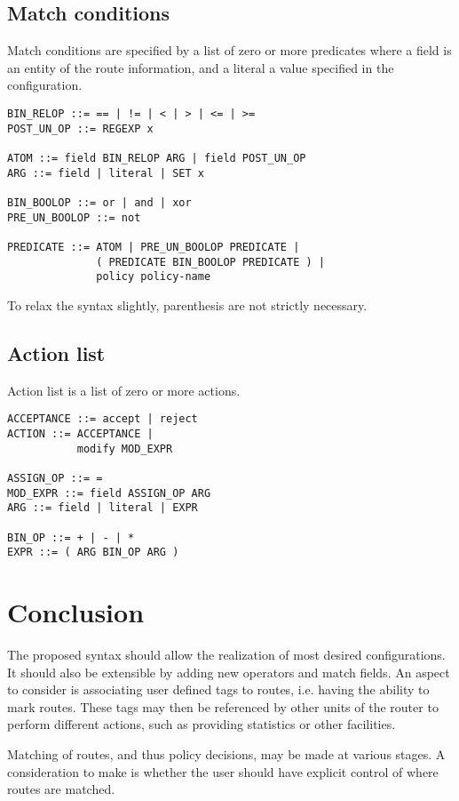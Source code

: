 \documentclass{article}
\begin{document}
\subsection{Match conditions}
Match conditions are specified by a list of zero or more predicates where a
field is an entity of the route information, and a literal a value specified in
the configuration.
\begin{verbatim}
BIN_RELOP ::= == | != | < | > | <= | >=
POST_UN_OP ::= REGEXP x

ATOM ::= field BIN_RELOP ARG | field POST_UN_OP
ARG ::= field | literal | SET x

BIN_BOOLOP ::= or | and | xor
PRE_UN_BOOLOP ::= not

PREDICATE ::= ATOM | PRE_UN_BOOLOP PREDICATE | 
              ( PREDICATE BIN_BOOLOP PREDICATE ) |
              policy policy-name
\end{verbatim}
To relax the syntax slightly, parenthesis are not strictly necessary.


\subsection{Action list}
Action list is a list of zero or more actions.
\begin{verbatim}
ACCEPTANCE ::= accept | reject
ACTION ::= ACCEPTANCE | 
           modify MOD_EXPR

ASSIGN_OP ::= =
MOD_EXPR ::= field ASSIGN_OP ARG
ARG ::= field | literal | EXPR

BIN_OP ::= + | - | * 
EXPR ::= ( ARG BIN_OP ARG )
\end{verbatim}



\section{Conclusion}
The proposed syntax should allow the realization of most desired configurations.
It should also be extensible by adding new operators and match fields. An aspect
to consider is associating user defined tags to routes, i.e. having the ability
to mark routes.  These tags may then be referenced by other units of the router
to perform different actions, such as providing statistics or other facilities.

Matching of routes, and thus policy decisions, may be made at various stages. A
consideration to make is whether the user should have explicit control of where
routes are matched.
\end{document}
